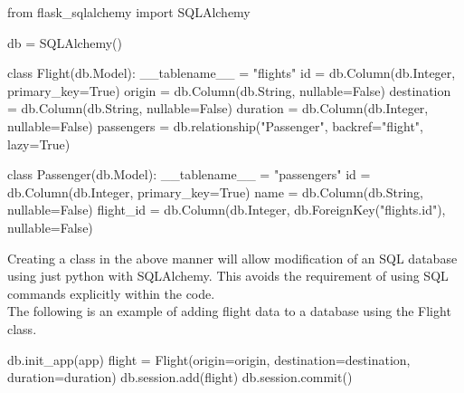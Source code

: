 \documentclass[]{book}
\newenvironment{Shaded}{\begin{snugshade}}{\end{snugshade}}
\newcommand{\BuiltInTok}[1]{#1}
\newcommand{\ExtensionTok}[1]{#1}
\newcommand{\FunctionTok}[1]{\textcolor[rgb]{0.00,0.00,0.00}{#1}}
\newcommand{\NormalTok}[1]{#1}
\newcommand{\StringTok}[1]{\textcolor[rgb]{0.31,0.60,0.02}{#1}}
\newcommand{\VariableTok}[1]{\textcolor[rgb]{0.00,0.00,0.00}{#1}}
\begin{document}
\begin{Shaded}
\begin{Highlighting}[]
\ExtensionTok{from}\NormalTok{ flask_sqlalchemy import SQLAlchemy               }
                                                      
\ExtensionTok{db}\NormalTok{ = SQLAlchemy()                                     }
                                                      
\ExtensionTok{class}\NormalTok{ Flight(db.Model)}\BuiltInTok{:}                               
    \ExtensionTok{__tablename__}\NormalTok{ = }\StringTok{"flights"}                         
    \FunctionTok{id}\NormalTok{ = db.Column(db.Integer, primary_key=True)      }
    \ExtensionTok{origin}\NormalTok{ = db.Column(db.String, nullable=False)     }
    \ExtensionTok{destination}\NormalTok{ = db.Column(db.String, nullable=False)}
    \ExtensionTok{duration}\NormalTok{ = db.Column(db.Integer, nullable=False)  }
    \ExtensionTok{passengers}\NormalTok{ = db.relationship(}\StringTok{"Passenger"}\NormalTok{, backref=}\StringTok{"flight"}\NormalTok{, lazy=True)}

\ExtensionTok{class}\NormalTok{ Passenger(db.Model)}\BuiltInTok{:}                                                        
    \ExtensionTok{__tablename__}\NormalTok{ = }\StringTok{"passengers"}                                                  
    \FunctionTok{id}\NormalTok{ = db.Column(db.Integer, primary_key=True)                                  }
    \ExtensionTok{name}\NormalTok{ = db.Column(db.String, nullable=False)                                   }
    \ExtensionTok{flight_id}\NormalTok{ = db.Column(db.Integer, db.ForeignKey(}\StringTok{"flights.id"}\NormalTok{), }\VariableTok{nullable=}\NormalTok{False)}
\end{Highlighting}
\end{Shaded}

Creating a class in the above manner will allow modification of an SQL database using just python with SQLAlchemy. This avoids the requirement of using SQL commands explicitly within the code.\\
The following is an example of adding flight data to a database using the Flight class.

\begin{Shaded}
\begin{Highlighting}[]
\ExtensionTok{db.init_app}\NormalTok{(app)}
\ExtensionTok{flight}\NormalTok{ = Flight(origin=origin, destination=destination, duration=duration)}
\ExtensionTok{db.session.add}\NormalTok{(flight)                                                    }
\ExtensionTok{db.session.commit}\NormalTok{()}
\end{Highlighting}
\end{Shaded}
\end{document}
